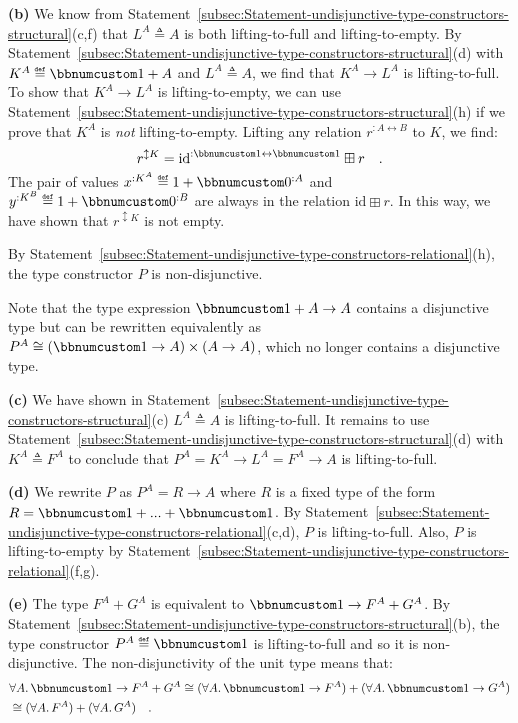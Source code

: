 \textbf{(b)} We know from Statement~\ref{subsec:Statement-undisjunctive-type-constructors-structural}(c,f)
that $L^{A}\triangleq A$ is both lifting-to-full and lifting-to-empty.
By Statement~\ref{subsec:Statement-undisjunctive-type-constructors-structural}(d)
with $K^{A}\triangleq\bbnum 1+A$ and $L^{A}\triangleq A$, we find
that $K^{A}\rightarrow L^{A}$ is lifting-to-full. To show that $K^{A}\rightarrow L^{A}$
is lifting-to-empty, we can use Statement~\ref{subsec:Statement-undisjunctive-type-constructors-structural}(h)
if we prove that $K^{A}$ is \emph{not} lifting-to-empty. Lifting
any relation $r^{:A\leftrightarrow B}$ to $K$, we find:
\[
r^{\updownarrow K}=\text{id}^{:\bbnum 1\leftrightarrow\bbnum 1}\boxplus r\quad.
\]
The pair of values $x^{:K^{A}}\triangleq1+\bbnum 0^{:A}$ and $y^{:K^{B}}\triangleq1+\bbnum 0^{:B}$
are always in the relation $\text{id}\boxplus r$. In this way, we
have shown that $r^{\updownarrow K}$ is not empty. 

By Statement~\ref{subsec:Statement-undisjunctive-type-constructors-relational}(h),
the type constructor $P$ is non-disjunctive. 

Note that the type expression $\bbnum 1+A\rightarrow A$ contains
a disjunctive type but can be rewritten equivalently as $P^{A}\cong(\bbnum 1\rightarrow A)\times(A\rightarrow A)$,
which no longer contains a disjunctive type.

\textbf{(c)} We have shown in Statement~\ref{subsec:Statement-undisjunctive-type-constructors-structural}(c)
$L^{A}\triangleq A$ is lifting-to-full. It remains to use Statement~\ref{subsec:Statement-undisjunctive-type-constructors-structural}(d)
with $K^{A}\triangleq F^{A}$ to conclude that $P^{A}=K^{A}\rightarrow L^{A}=F^{A}\rightarrow A$
is lifting-to-full.

\textbf{(d)} We rewrite $P$ as $P^{A}=R\rightarrow A$ where $R$
is a fixed type of the form $R=\bbnum 1+...+\bbnum 1$. By Statement~\ref{subsec:Statement-undisjunctive-type-constructors-relational}(c,d),
$P$ is lifting-to-full. Also, $P$ is lifting-to-empty by Statement~\ref{subsec:Statement-undisjunctive-type-constructors-relational}(f,g).

\textbf{(e)} The type $F^{A}+G^{A}$ is equivalent to $\bbnum 1\rightarrow F^{A}+G^{A}$.
By Statement~\ref{subsec:Statement-undisjunctive-type-constructors-structural}(b),
the type constructor $P^{A}\triangleq\bbnum 1$ is lifting-to-full
and so it is non-disjunctive. The non-disjunctivity of the unit type
means that:
\begin{align*}
 & \forall A.\,\bbnum 1\rightarrow F^{A}+G^{A}\cong(\forall A.\,\bbnum 1\rightarrow F^{A})+(\forall A.\,\bbnum 1\rightarrow G^{A})\\
 & \cong(\forall A.\,F^{A})+(\forall A.\,G^{A})\quad.
\end{align*}

